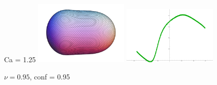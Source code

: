 \documentclass[12pt]{article}
\numberwithin{equation}{section}
\begin{document}
\begin{figure}[h]
\begin{center}
	\\
	Ca = 1.25 
	\includegraphics[width=0.4\textwidth]{shape/shape_vred95_conf95_v1eb05}
	\includegraphics[width=0.4\textwidth]{tension/tension_vred95_conf95_v1eb05}
\caption{$\nu = 0.95$, conf = 0.95}
\end{center}
\end{figure}
\end{document}
